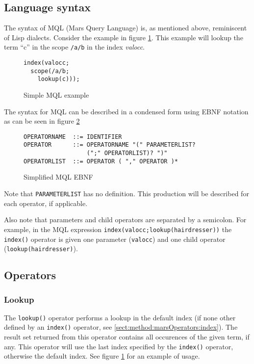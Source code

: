 \subsection{Language syntax}
The syntax of MQL (Mars Query Language) is, as mentioned above, reminiscent of
Lisp dialects. Consider the example in figure \ref{figure:mql:op_example}. This
example will lookup the term ``c'' in the scope \texttt{/a/b} in the index
\textit{valocc}.

\begin{figure}[!h]
\centering
\begin{Verbatim}
index(valocc; 
  scope(/a/b;
    lookup(c)));
\end{Verbatim}
\caption{Simple MQL example}
\label{figure:mql:op_example}
\end{figure}

The syntax for MQL can be described in a condensed form using EBNF notation as
can be seen in figure \ref{figure:mql:ebnf}
\begin{figure}[!h]
\centering
\begin{Verbatim}
OPERATORNAME  ::= IDENTIFIER
OPERATOR      ::= OPERATORNAME "(" PARAMETERLIST? 
                  (";" OPERATORLIST)? ")"
OPERATORLIST  ::= OPERATOR ( "," OPERATOR )*
\end{Verbatim}
\caption{Simplified MQL EBNF}
\label{figure:mql:ebnf}
\end{figure}

Note that \texttt{PARAMETERLIST} has no definition. This production will be
described for each operator, if applicable.

Also note that parameters and child operators are separated by a semicolon. For
example, in the MQL expression \texttt{index(valocc;lookup(hairdresser))} the
\texttt{index()} operator is given one parameter (\texttt{valocc}) and one
child operator (\texttt{lookup(hairdresser)}).

\subsection{Operators}
\label{sect:method:marsOperators}
\subsubsection{Lookup}
\label{sect:method:marsOperators:lookup}
The \texttt{lookup()} operator performs a lookup in the default index (if none
other defined by an \texttt{index()} operator, see
\ref{sect:method:marsOperators:index}). The result set returned from this
operator contains all occurences of the given term, if any. This operator will
use the last index specified by the \texttt{index()} operator, otherwise the
default index. See figure \ref{figure:mql:op_example} for an example of usage. 

